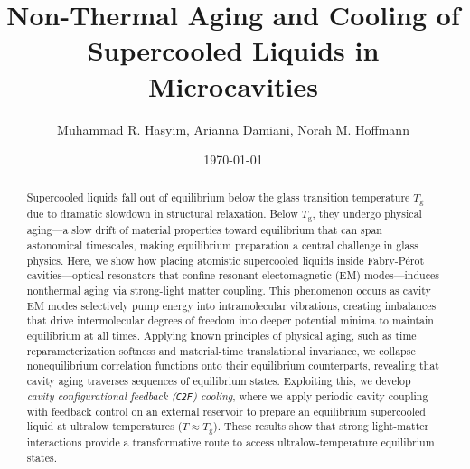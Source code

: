 \documentclass[%
 reprint,
 amsmath,amssymb,
 aps,
]{revtex4-2}
\begin{document}

\title{Non-Thermal Aging and Cooling of Supercooled Liquids in Microcavities}%

\author{Muhammad R. Hasyim, Arianna Damiani, Norah M. Hoffmann}
%


\date{\today}%

\begin{abstract}

Supercooled liquids fall out of equilibrium below the glass transition temperature $T_\mathrm{g}$ due to dramatic slowdown in structural relaxation. 
Below $T_\mathrm{g}$, they undergo physical aging---a slow drift of material properties toward equilibrium that can span astonomical timescales, making equilibrium preparation a central challenge in glass physics. 
Here, we show how placing atomistic supercooled liquids inside Fabry-Pérot cavities---optical resonators that confine resonant electomagnetic (EM) modes---induces nonthermal aging via strong-light matter coupling. 
This phenomenon occurs as cavity EM modes selectively pump energy into intramolecular vibrations, creating imbalances that drive intermolecular degrees of freedom into deeper potential minima to maintain equilibrium at all times.
Applying known principles of physical aging, such as time reparameterization softness and material-time translational invariance,  we collapse nonequilibrium correlation functions onto their equilibrium counterparts, revealing that cavity aging traverses sequences of equilibrium states.
Exploiting this, we develop \textit{cavity configurational feedback (\texttt{C2F}) cooling}, where we apply periodic cavity coupling with feedback control on an external reservoir to prepare an equilibrium supercooled liquid at ultralow temperatures ($T \approx  T_\mathrm{g}$).
These results show that strong light-matter interactions provide a transformative route to access ultralow-temperature equilibrium states. %


\end{abstract}
\end{document}
